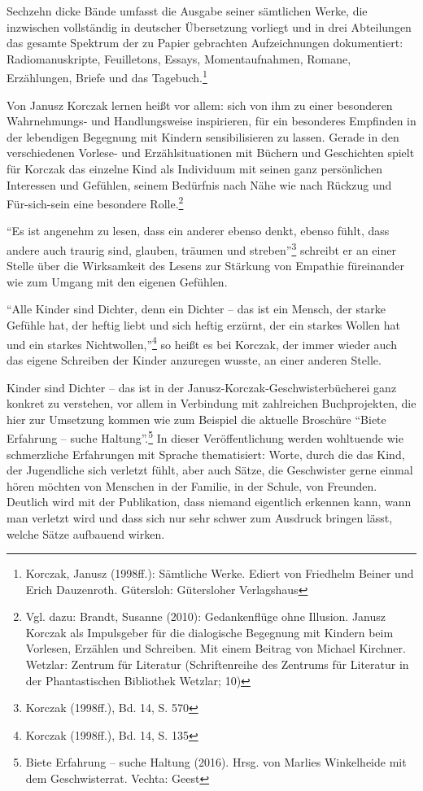\documentclass[a4paper,
fontsize=11pt,
oneside,
numbers=noperiodatend,
parskip=half-,
bibliography=totoc,
final
]{scrartcl}
\begin{document}
Sechzehn dicke Bände umfasst die Ausgabe seiner sämtlichen Werke, die
inzwischen vollständig in deutscher Übersetzung vorliegt und in drei
Abteilungen das gesamte Spektrum der zu Papier gebrachten Aufzeichnungen
dokumentiert: Radiomanuskripte, Feuilletons, Essays, Momentaufnahmen,
Romane, Erzählungen, Briefe und das Tagebuch.\footnote{Korczak, Janusz
  (1998ff.): Sämtliche Werke. Ediert von Friedhelm Beiner und Erich
  Dauzenroth. Gütersloh: Gütersloher Verlagshaus}

Von Janusz Korczak lernen heißt vor allem: sich von ihm zu einer
besonderen Wahrnehmungs- und Handlungsweise inspirieren, für ein
besonderes Empfinden in der lebendigen Begegnung mit Kindern
sensibilisieren zu lassen. Gerade in den verschiedenen Vorlese- und
Erzählsituationen mit Büchern und Geschichten spielt für Korczak das
einzelne Kind als Individuum mit seinen ganz persönlichen Interessen und
Gefühlen, seinem Bedürfnis nach Nähe wie nach Rückzug und Für-sich-sein
eine besondere Rolle.\footnote{Vgl. dazu: Brandt, Susanne (2010):
  Gedankenflüge ohne Illusion. Janusz Korczak als Impulsgeber für die
  dialogische Begegnung mit Kindern beim Vorlesen, Erzählen und
  Schreiben. Mit einem Beitrag von Michael Kirchner. Wetzlar: Zentrum
  für Literatur (Schriftenreihe des Zentrums für Literatur in der
  Phantastischen Bibliothek Wetzlar; 10)}

\enquote{Es ist angenehm zu lesen, dass ein anderer ebenso denkt, ebenso
fühlt, dass andere auch traurig sind, glauben, träumen und
streben}\footnote{Korczak (1998ff.), Bd. 14, S. 570} schreibt er an
einer Stelle über die Wirksamkeit des Lesens zur Stärkung von Empathie
füreinander wie zum Umgang mit den eigenen Gefühlen.

\enquote{Alle Kinder sind Dichter, denn ein Dichter -- das ist ein
Mensch, der starke Gefühle hat, der heftig liebt und sich heftig
erzürnt, der ein starkes Wollen hat und ein starkes
Nichtwollen,}\footnote{Korczak (1998ff.), Bd. 14, S. 135} so heißt es
bei Korczak, der immer wieder auch das eigene Schreiben der Kinder
anzuregen wusste, an einer anderen Stelle.

Kinder sind Dichter -- das ist in der Janusz-Korczak-Geschwisterbücherei
ganz konkret zu verstehen, vor allem in Verbindung mit zahlreichen
Buchprojekten, die hier zur Umsetzung kommen wie zum Beispiel die
aktuelle Broschüre \enquote{Biete Erfahrung -- suche Haltung}.\footnote{Biete
  Erfahrung -- suche Haltung (2016). Hrsg. von Marlies Winkelheide mit
  dem Geschwisterrat. Vechta: Geest} In dieser Veröffentlichung werden
wohltuende wie schmerzliche Erfahrungen mit Sprache thematisiert: Worte,
durch die das Kind, der Jugendliche sich verletzt fühlt, aber auch
Sätze, die Geschwister gerne einmal hören möchten von Menschen in der
Familie, in der Schule, von Freunden.\\
Deutlich wird mit der Publikation, dass niemand eigentlich erkennen
kann, wann man verletzt wird und dass sich nur sehr schwer zum Ausdruck
bringen lässt, welche Sätze aufbauend wirken.
\end{document}
